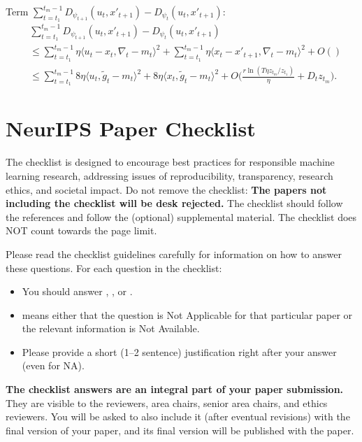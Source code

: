 \documentclass{article}
\theoremstyle{plain}
\theoremstyle{definition}
\theoremstyle{remark}
\renewcommand{\tilde}{\widetilde}
\begin{document}
Term $\sum_{t=t_1}^{t_m-1}D_{\psi_{t+1}}(u_t,x'_{t+1})-D_{\psi_t}(u_t,x'_{t+1})$:
\begin{align*}
&\sum_{t=t_1}^{t_m-1}D_{\psi_{t+1}}(u_t,x'_{t+1})-D_{\psi_t}(u_t,x'_{t+1})\\
& \leq \sum_{t=t_1}^{t_m-1} \eta\langle u_t-x_{t},\nabla_t-m_t\rangle^2+\sum_{t=t_1}^{t_m-1}\eta\langle x_{t}-x'_{t+1},\nabla_t-m_t\rangle^2+O() \\
&\leq \sum_{t={t_1}}^{t_m-1} 8\eta\langle u_t,\tilde{g}_t-m_t\rangle^2+8\eta\langle x_{t},\tilde{g}_t-m_t\rangle^2+O\Big(\frac{r\ln(T\eta z_{t_m}/z_{t_1})}{\eta}+D_t z_{t_m}\Big).
\end{align*}
\fi

\iffalse
\newpage
\section*{NeurIPS Paper Checklist}

\iffalse
The checklist is designed to encourage best practices for responsible machine learning research, addressing issues of reproducibility, transparency, research ethics, and societal impact. Do not remove the checklist: {\bf The papers not including the checklist will be desk rejected.} The checklist should follow the references and follow the (optional) supplemental material.  The checklist does NOT count towards the page
limit. 

Please read the checklist guidelines carefully for information on how to answer these questions. For each question in the checklist:
\begin{itemize}
    \item You should answer \answerYes{}, \answerNo{}, or \answerNA{}.
    \item \answerNA{} means either that the question is Not Applicable for that particular paper or the relevant information is Not Available.
    \item Please provide a short (1–2 sentence) justification right after your answer (even for NA). 
\end{itemize}

{\bf The checklist answers are an integral part of your paper submission.} They are visible to the reviewers, area chairs, senior area chairs, and ethics reviewers. You will be asked to also include it (after eventual revisions) with the final version of your paper, and its final version will be published with the paper.
\end{document}
